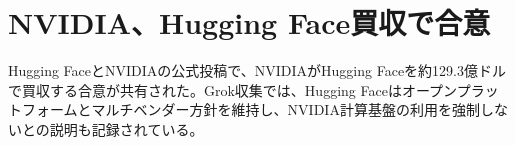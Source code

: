 \section{NVIDIA、Hugging Face買収で合意}

Hugging FaceとNVIDIAの公式投稿で、NVIDIAがHugging Faceを約129.3億ドルで買収する合意が共有された。Grok収集では、Hugging Faceはオープンプラットフォームとマルチベンダー方針を維持し、NVIDIA計算基盤の利用を強制しないとの説明も記録されている。


